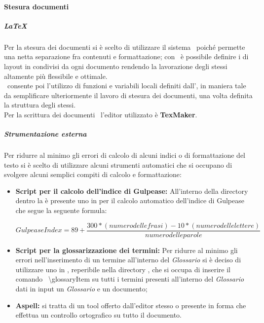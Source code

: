     \paragraph{Stesura documenti}
      \subparagraph{\LaTeX}
        Per la stesura dei documenti si è scelto di utilizzare il sistema \glossaryItem{\LaTeX}\ poiché permette una netta separazione fra contenuti
        e formattazione; con \glossaryItem{\LaTeX}\ è possibile definire i  di layout in  condivisi da ogni documento rendendo la lavorazione
        degli stessi altamente più flessibile e ottimale.\\
        \glossaryItem{\LaTeX}\ consente poi l'utilizzo di funzioni e variabili locali definiti dall', in maniera tale da semplificare ulteriormente
        il lavoro di stesura dei documenti, una volta definita la struttura degli stessi.\\
        Per la scrittura dei documenti \glossaryItem{\LaTeX}\ l'editor utilizzato è \textbf{TexMaker}.
      \subparagraph{Strumentazione esterna}
        Per ridurre al minimo gli errori di calcolo di alcuni indici o di formattazione del testo si è scelto di utilizzare alcuni strumenti
        automatici che si occupano di svolgere alcuni semplici compiti di calcolo e formattazione:
        \begin{itemize}
          \item \textbf{Script  per il calcolo dell'indice di Gulpease: }All'interno della directory  dentro la  è presente
          uno  in  per il calcolo automatico dell'indice di Gulpease che segue la seguente formula:
          \begin{center}
            \begin{equation}
              Gulpease Index = 89+\frac{300*( numero delle frasi ) - 10*( numero delle lettere )}{numero delle parole}
            \end{equation}
          \end{center}
          \item \textbf{Script  per la glossarizzazione dei termini: }Per ridurre al minimo gli errori nell'inserimento di un termine all'interno
          del \emph{Glossario} si è deciso di utilizzare uno  in , reperibile nella directory , che si occupa di inserire
          il comando \glossaryItem{\LaTeX}\ \textbackslash glossaryItem{} su tutti i termini presenti all'interno del \emph{Glossario} dati in input un \emph{Glossario}
          e un documento;
          \item \textbf{Aspell: }si tratta di un tool offerto dall'editor stesso o presente in forma  che effettua un controllo ortografico
          su tutto il documento.
        \end{itemize}
   

